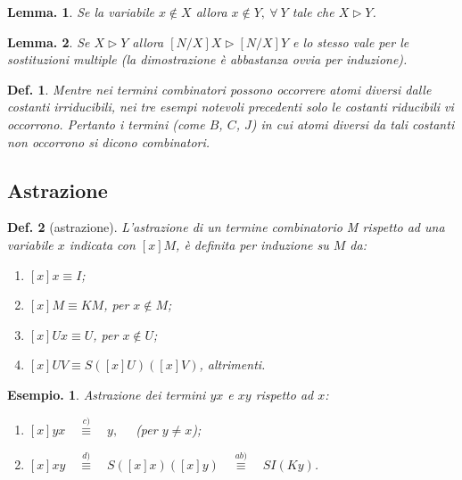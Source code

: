 \documentclass{book}
\newtheorem{definizione}{Def.}[chapter]
\newtheorem{lemma}{Lemma.}[chapter]
\newtheorem{esempio}{Esempio.}
\begin{document}
\begin{lemma}
Se la variabile $x \notin X$ allora $x \notin Y,\ \forall\ Y$ tale che $X
\vartriangleright Y$.
\end{lemma}
\begin{lemma}
Se $X \vartriangleright Y$ allora $[N/X]X \vartriangleright [N/X]Y$ e lo
stesso vale per le sostituzioni multiple (la dimostrazione \`e abbastanza
ovvia per induzione).
\end{lemma}

\vspace{0.3 cm}\begin{definizione}
Mentre nei termini combinatori possono occorrere atomi diversi dalle costanti
irriducibili, nei tre esempi notevoli precedenti solo le costanti riducibili
vi occorrono.
Pertanto i termini (come $B$, $C$, $J$) in cui atomi diversi da tali costanti
non occorrono si dicono \emph{combinatori}.
\end{definizione}

\subsection{Astrazione}
\begin{definizione}[astrazione]
L'\emph{astrazione} di un termine combinatorio M rispetto ad una variabile $x$
indicata con $[x]M$, \`e definita per induzione su $M$ da:
\begin{enumerate}
\item[a)]$[x]x \equiv I$;
\item[b)]$[x]M \equiv KM$, \quad per $x \notin M$;
\item[c)]$[x]Ux \equiv U$, \quad per $x \notin U$;
\item[d)]$[x]UV \equiv S([x]U)([x]V)$, \quad altrimenti.
\end{enumerate}
\end{definizione}

\begin{esempio}
Astrazione dei termini $yx$ e $xy$ rispetto ad $x$:
\begin{enumerate}
\item[-]$[x]yx \quad \stackrel{c)}{\equiv} \quad y,\quad$  (per $y \neq x$);
\item[-]$[x]xy \quad \stackrel{d)}{\equiv} \quad S([x]x)([x]y) \quad
\stackrel{a b)}{\equiv} \quad SI(Ky)$.
\end{enumerate}
\end{esempio}
\end{document}
